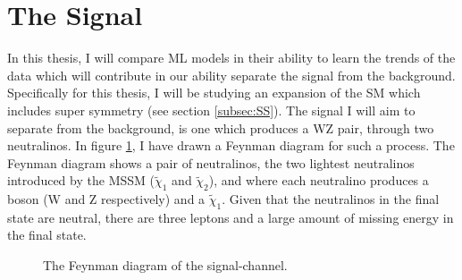 \section{The Signal}\label{sec:signal}
In this thesis, I will compare \ac{ML} models in their ability to learn the trends of the data which will contribute  
in our ability separate the signal from the background. Specifically for this thesis, I will be studying an expansion of the 
\ac{SM} which includes super symmetry (see section \ref{subsec:SS}). The signal I will aim to separate from the background, is one 
which produces a WZ pair, through two neutralinos. In figure \ref{fig:signal}, I have drawn a Feynman diagram for such a process.
The Feynman diagram shows a pair of neutralinos, the two lightest neutralinos introduced by the \ac{MSSM} ($\tilde{\chi}_1$ and $\tilde{\chi}_2$), 
and where each neutralino produces a boson (W and Z respectively) and a $\tilde{\chi}_1$. Given that the neutralinos in the final state 
are neutral, there are three leptons and a large amount of missing energy in the final state.
\begin{figure}
    \centering
    \caption{The Feynman diagram of the signal-channel.}
    \label{fig:signal}
\end{figure}